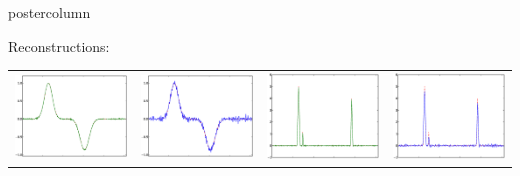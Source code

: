 \documentclass[final]{beamer}
\begin{document}
\begin{frame}
\begin{columns}
\begin{column}{.32\textwidth}
\begin{beamercolorbox}[center,wd=\textwidth]{postercolumn}
\begin{minipage}[T]{.95\textwidth}
{\begin{block}{Reconstructions:}
\begin{table}
\begin{tabular}{cccc}
                  \includegraphics[width=3.4in,trim=0 30 0 0,clip]{./figures/minesmooth1500.eps} &
                  \includegraphics[width=3.4in,trim=0 30 0 0,clip]{./figures/GCVsmooth500.eps} & 
                  \includegraphics[width=3.4in,trim=0 30 0 0,clip]{./figures/minepeaked1000.eps}&
                  \includegraphics[width=3.4in,trim=0 30 0 0,clip]{./figures/GCVpeaked40.eps} 
                \end{tabular}
              \end{table}


\end{block}}
\end{minipage}
\end{beamercolorbox}
\end{column}
\end{columns}
\end{frame}
\end{document}
